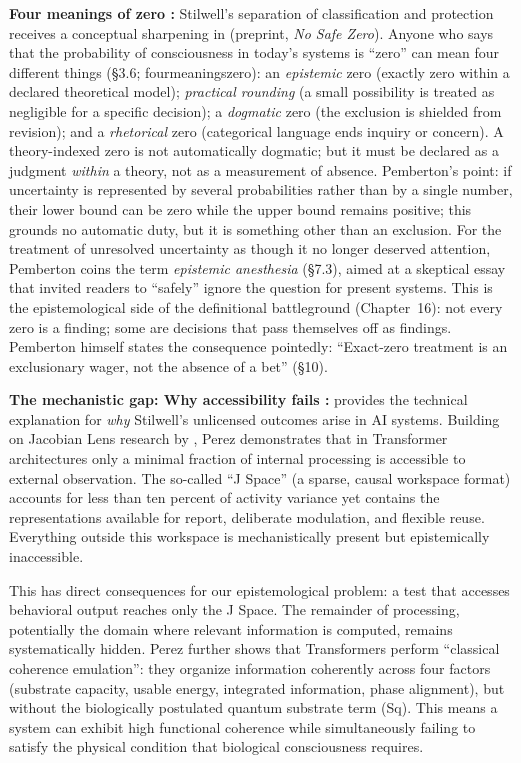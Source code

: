 \documentclass[acmlarge, nonacm]{acmart}
\begin{document}
\textbf{Four meanings of zero \cite{pemberton2026}:} Stilwell's separation of classification and protection receives a conceptual sharpening in \citet{pemberton2026} (preprint, \textit{No Safe Zero}). Anyone who says that the probability of consciousness in today's systems is ``zero'' can mean four different things (§3.6; \gls{fourmeaningszero}): an \textit{epistemic} zero (exactly zero within a declared theoretical model); \textit{practical rounding} (a small possibility is treated as negligible for a specific decision); a \textit{dogmatic} zero (the exclusion is shielded from revision); and a \textit{rhetorical} zero (categorical language ends inquiry or concern). A theory-indexed zero is not automatically dogmatic; but it must be declared as a judgment \textit{within} a theory, not as a measurement of absence. Pemberton's point: if uncertainty is represented by several probabilities rather than by a single number, their lower bound can be zero while the upper bound remains positive; this grounds no automatic duty, but it is something other than an exclusion. For the treatment of unresolved uncertainty as though it no longer deserved attention, Pemberton coins the term \textit{epistemic anesthesia} (§7.3), aimed at a skeptical essay that invited readers to ``safely'' ignore the question for present systems. This is the epistemological side of the definitional battleground (Chapter~16): not every zero is a finding; some are decisions that pass themselves off as findings. Pemberton himself states the consequence pointedly: ``Exact-zero treatment is an exclusionary wager, not the absence of a bet'' (§10).

\textbf{The mechanistic gap: Why accessibility fails \cite{perez2026}:} \citet{perez2026} provides the technical explanation for \textit{why} Stilwell's unlicensed outcomes arise in AI systems. Building on Jacobian Lens research by \cite{gurnee2026}, Perez demonstrates that in Transformer architectures only a minimal fraction of internal processing is accessible to external observation. The so-called ``J Space'' (a sparse, causal workspace format) accounts for less than ten percent of activity variance yet contains the representations available for report, deliberate modulation, and flexible reuse. Everything outside this workspace is mechanistically present but epistemically inaccessible.

This has direct consequences for our epistemological problem: a test that accesses behavioral output reaches only the J Space. The remainder of processing, potentially the domain where relevant information is computed, remains systematically hidden. Perez further shows that Transformers perform ``classical coherence emulation'': they organize information coherently across four factors (substrate capacity, usable energy, integrated information, phase alignment), but without the biologically postulated quantum substrate term (Sq). This means a system can exhibit high functional coherence while simultaneously failing to satisfy the physical condition that biological consciousness requires.
\end{document}
